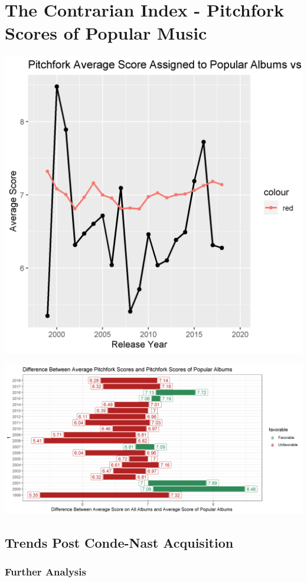 \documentclass[a4paper,12pt]{article}
\begin{document}
\section{The Contrarian Index - Pitchfork Scores of Popular Music}
\includegraphics[width = \linewidth]{"figures/contrarian_index.png"}

\includegraphics[width = \linewidth]{"figures/contrarian_index_bar.png"}

\subsection{Trends Post Conde-Nast Acquisition}
\subsubsection{Further Analysis}
\end{document}
